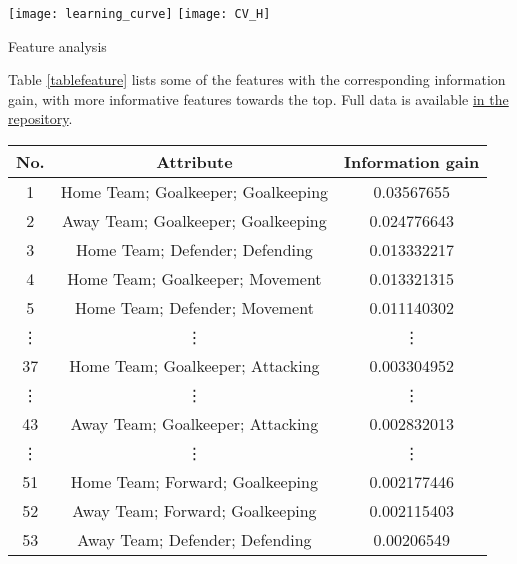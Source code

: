 \documentclass[a4paper,11pt,table]{article}
\begin{document}
\begin{center}
    \texttt{[image: learning\_curve]}
    \texttt{[image: CV\_H]}
\end{center}

Feature analysis

Table \ref{tablefeature} lists some of the features with the corresponding information gain, with more informative features towards the top. Full data is available \href{https://github.com/TheLordBlarg/Soccer_Success/blob/master/results/entropy_train.csv}{in the repository}.
\begin{center}
    \begin{tabular}{|c|c|c|}
        \hline
        No. &   Attribute                           &   Information gain \\
        \hline
        1   &   Home Team; Goalkeeper; Goalkeeping  &   0.03567655 \\
        \hline
        2   &   Away Team; Goalkeeper; Goalkeeping  &   0.024776643 \\
        \hline
        3   &   Home Team; Defender; Defending      &   0.013332217 \\
        \hline
        4   &   Home Team; Goalkeeper; Movement     &   0.013321315 \\
        \hline
        5   &   Home Team; Defender; Movement       &   0.011140302 \\
        \hline
        \vdots  &   \vdots  &   \vdots \\
        \hline
        37  &   Home Team; Goalkeeper; Attacking    &   0.003304952 \\
        \hline
        \vdots  &   \vdots  &   \vdots \\
        \hline
        43  &   Away Team; Goalkeeper; Attacking    &   0.002832013 \\
        \hline
        \vdots  &   \vdots  &   \vdots \\
        \hline
        51  &   Home Team; Forward; Goalkeeping     &   0.002177446 \\
        \hline
        52  &   Away Team; Forward; Goalkeeping     &   0.002115403 \\
        \hline
        53  &   Away Team; Defender; Defending      &   0.00206549 \\
        \hline
    \end{tabular}
\end{center}
~\\
\end{document}

